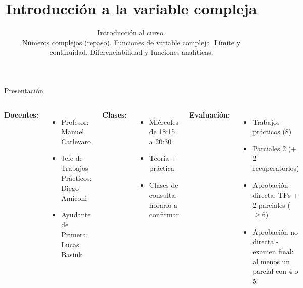 \documentclass[9pt, aspectratio=169]{beamer}
\title{Introducción a la variable compleja}
\subtitle{Introducción al curso.\\ Números complejos (repaso). Funciones de variable compleja. Límite y continuidad. Diferenciabilidad y funciones analíticas.}
\begin{document}
\maketitle

\begin{frame}{ Presentación }
    \begin{columns}[t]
    \cx
    \textbf{Docentes:}
    \begin{itemize}
    \item Profesor: Manuel Carlevaro
    \item Jefe de Trabajos Prácticos: Diego Amiconi
    \item Ayudante de Primera: Lucas Basiuk
    \end{itemize}
    \vspace{1em}

    \textbf{Clases:}
    \begin{itemize}
    \item Miércoles de 18:15 a 20:30
    \item Teoría + práctica
    \item Clases de consulta: horario a confirmar
    \end{itemize}
    \cx
    \textbf{Evaluación:}
    \begin{itemize}
    \item Trabajos prácticos (8)
    \item Parciales 2 (+ 2 recuperatorios)
    \item Aprobación directa: TPs + 2 parciales ($\geq 6$)
    \item Aprobación no directa - examen final: al menos un parcial con 4 o 5 
    \end{itemize}
    \end{columns}
\end{frame}
\end{document}
